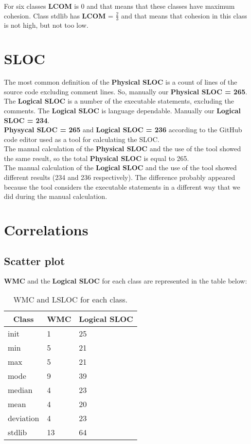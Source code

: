 \documentclass[12pt]{article}
\begin{document}
For six classes \textbf{LCOM} is 0 and that means that these classes have maximum cohesion. Class stdlib has \textbf{LCOM} = $\frac{2}{3}$ and that means that cohesion in this class is not high, but not too low.
\section{SLOC}
The most common definition of the \textbf{Physical SLOC} is a count of lines of the source code excluding comment lines.
So, manually our \textbf{Physical SLOC = 265}. The \textbf{Logical SLOC} is a number of the executable statements, excluding the comments. The \textbf{Logical SLOC} is language dependable. Manually our \textbf{Logical SLOC = 234}.\\

\textbf{Physycal SLOC = 265} and \textbf{Logical SLOC = 236} according to the GitHub code editor used as a tool for calculating the SLOC.\\

The manual calculation of the \textbf{Physical SLOC} and the use of the tool showed the same result, so the total \textbf{Physical SLOC} is equal to 265. \\

The manual calculation of the \textbf{Logical SLOC} and the use of the tool showed different results (234 and 236 respectively). The difference probably appeared because the tool considers the executable statements in a different way that we did during the manual calculation. 
\section{Correlations}
\subsection{Scatter plot}
\par \textbf{WMC} and the \textbf{Logical SLOC} for each class are represented in the table below:
\begin{table}[h]
\centering
\begin{tabular}{|l|l|l|}
\hline
\multicolumn{1}{|c|}{\textbf{Class}} & \multicolumn{1}{c|}{\textbf{WMC}} & \textbf{Logical SLOC} \\ \hline
init & 1 & 25 \\ \hline
min & 5 & 21 \\ \hline
max & 5 & 21 \\ \hline
mode & 9 & 39 \\ \hline
median & 4 & 23 \\ \hline
mean & 4 & 20 \\ \hline
deviation & 4 & 23 \\ \hline
stdlib & 13 & 64 \\ \hline
\end{tabular}
\caption{WMC and LSLOC for each class.}
\end{table}
\end{document}
